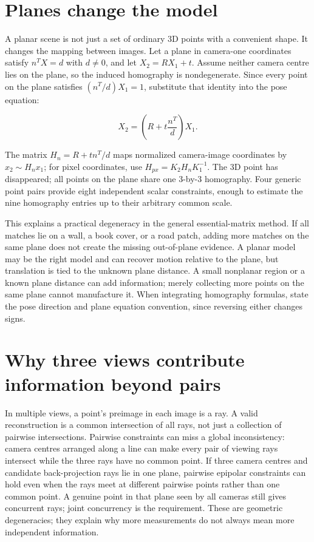 \section{Planes change the model}\label{02-foundations-ii-ch036-planes-change-the-model}

A planar scene is not just a set of ordinary 3D points with a convenient shape. It changes the mapping between images. Let a plane in camera-one coordinates satisfy \(n^TX=d\) with \(d\ne0\), and let \(X_2=RX_1+t\). Assume neither camera centre lies on the plane, so the induced homography is nondegenerate. Since every point on the plane satisfies \((n^T/d)X_1=1\), substitute that identity into the pose equation:

\[X_2=\left(R+t\frac{n^T}{d}\right)X_1.\]

The matrix \(H_n=R+t n^T/d\) maps normalized camera-image coordinates by \(x_2\sim H_nx_1\); for pixel coordinates, use \(H_{px}=K_2H_nK_1^{-1}\). The 3D point has disappeared; all points on the plane share one 3-by-3 homography. Four generic point pairs provide eight independent scalar constraints, enough to estimate the nine homography entries up to their arbitrary common scale.

This explains a practical degeneracy in the general essential-matrix method. If all matches lie on a wall, a book cover, or a road patch, adding more matches on the same plane does not create the missing out-of-plane evidence. A planar model may be the right model and can recover motion relative to the plane, but translation is tied to the unknown plane distance. A small nonplanar region or a known plane distance can add information; merely collecting more points on the same plane cannot manufacture it. When integrating homography formulas, state the pose direction and plane equation convention, since reversing either changes signs.

\section{Why three views contribute information beyond pairs}\label{02-foundations-ii-ch036-why-three-views-contribute-information-beyond-pairs}

In multiple views, a point's preimage in each image is a ray. A valid reconstruction is a common intersection of all rays, not just a collection of pairwise intersections. Pairwise constraints can miss a global inconsistency: camera centres arranged along a line can make every pair of viewing rays intersect while the three rays have no common point. If three camera centres and candidate back-projection rays lie in one plane, pairwise epipolar constraints can hold even when the rays meet at different pairwise points rather than one common point. A genuine point in that plane seen by all cameras still gives concurrent rays; joint concurrency is the requirement. These are geometric degeneracies; they explain why more measurements do not always mean more independent information.

